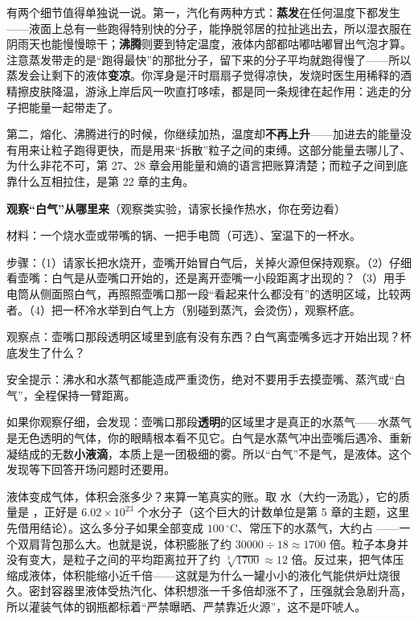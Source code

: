 有两个细节值得单独说一说。第一，汽化有两种方式：\textbf{蒸发}在任何温度下都发生——液面上总有一些跑得特别快的分子，能挣脱邻居的拉扯逃出去，所以湿衣服在阴雨天也能慢慢晾干；\textbf{沸腾}则要到特定温度，液体内部都咕嘟咕嘟冒出气泡才算。注意蒸发带走的是“跑得最快”的那批分子，留下来的分子平均就跑得慢了——所以蒸发会让剩下的液体\textbf{变凉}。你浑身是汗时扇扇子觉得凉快，发烧时医生用稀释的酒精擦皮肤降温，游泳上岸后风一吹直打哆嗦，都是同一条规律在起作用：逃走的分子把能量一起带走了。

第二，熔化、沸腾进行的时候，你继续加热，温度却\textbf{不再上升}——加进去的能量没有用来让粒子跑得更快，而是用来“拆散”粒子之间的束缚。这部分能量去哪儿了、为什么非花不可，第 27、28 章会用能量和熵的语言把账算清楚；而粒子之间到底靠什么互相拉住，是第 22 章的主角。

\begin{shiyan}
\textbf{观察“白气”从哪里来}（观察类实验，请家长操作热水，你在旁边看）

材料：一个烧水壶或带嘴的锅、一把手电筒（可选）、室温下的一杯水。

步骤：（1）请家长把水烧开，壶嘴开始冒白气后，关掉火源但保持观察。（2）仔细看壶嘴：白气是从壶嘴口开始的，还是离开壶嘴一小段距离才出现的？（3）用手电筒从侧面照白气，再照照壶嘴口那一段“看起来什么都没有”的透明区域，比较两者。（4）把一杯冷水举到白气上方（别碰到蒸汽，会烫伤），观察杯底。

观察点：壶嘴口那段透明区域里到底有没有东西？白气离壶嘴多远才开始出现？杯底发生了什么？

安全提示：沸水和水蒸气都能造成严重烫伤，绝对不要用手去摸壶嘴、蒸汽或“白气”，全程保持一臂距离。
\end{shiyan}

如果你观察仔细，会发现：壶嘴口那段\textbf{透明}的区域里才是真正的水蒸气——水蒸气是无色透明的气体，你的眼睛根本看不见它。白气是水蒸气冲出壶嘴后遇冷、重新凝结成的无数\textbf{小液滴}，本质上是一团极细的雾。所以“白气”不是气，是液体。这个发现等下回答开场问题时还要用。

\begin{qiaoliang}
液体变成气体，体积会涨多少？来算一笔真实的账。取  水（大约一汤匙），它的质量是 ，正好是 $6.02\times 10^{23}$ 个水分子（这个巨大的计数单位是第 5 章的主题，这里先借用结论）。这么多分子如果全部变成 $100\,^{\circ}\mathrm{C}$、常压下的水蒸气，大约占 ——一个双肩背包那么大。也就是说，体积膨胀了约 $30000\div 18\approx 1700$ 倍。粒子本身并没有变大，是粒子之间的平均距离拉开了约 $\sqrt[3]{1700}\approx 12$ 倍。反过来，把气体压缩成液体，体积能缩小近千倍——这就是为什么一罐小小的液化气能供炉灶烧很久。密封容器里液体受热汽化、体积想涨一千多倍却涨不了，压强就会急剧升高，所以灌装气体的钢瓶都标着“严禁曝晒、严禁靠近火源”，这不是吓唬人。
\end{qiaoliang}

